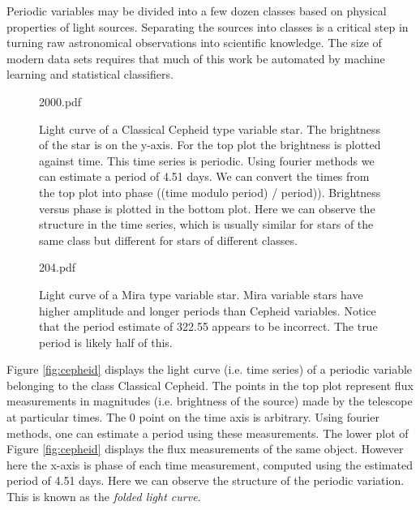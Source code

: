 \documentclass[10pt]{article}
\theoremstyle{definition}
\begin{document}
Periodic variables may be divided into a few dozen classes based on physical properties of light sources. Separating the sources into classes is a critical step in turning raw astronomical observations into scientific knowledge. The size of modern data sets requires that much of this work be automated by machine learning and statistical classifiers. 
\begin{figure}[ht]
\begin{minipage}[t]{.45\linewidth}
  \centering
    \begin{includegraphics}[scale=.48]{2000.pdf}
      \caption{Light curve of a Classical Cepheid type variable star. The brightness of the star is on the y-axis. For the top plot the brightness is plotted against time. This time series is periodic. Using fourier methods we can estimate a period of 4.51 days. We can convert the times from the top plot into phase ((time modulo period) / period)). Brightness versus phase is plotted in the bottom plot. Here we can observe the structure in the time series, which is usually similar for stars of the same class but different for stars of different classes.\label{fig:cepheid}}
    \end{includegraphics}
\end{minipage}
\hspace{1cm}
\begin{minipage}[t]{.45\linewidth}
  \centering
    \begin{includegraphics}[scale=.48]{204.pdf}
      \caption{Light curve of a Mira type variable star. Mira variable stars have higher amplitude and longer periods than Cepheid variables. Notice that the period estimate of 322.55 appears to be incorrect. The true period is likely half of this.\label{fig:mira}}
    \end{includegraphics}
\end{minipage}
\end{figure}

Figure \ref{fig:cepheid} displays the light curve (i.e. time series) of a periodic variable belonging to the class Classical Cepheid. The points in the top plot represent flux measurements in magnitudes (i.e. brightness of the source) made by the telescope at particular times. The 0 point on the time axis is arbitrary. Using fourier methods, one can estimate a period using these measurements.  The lower plot of Figure \ref{fig:cepheid} displays the flux measurements of the same object. However here the x-axis is phase of each time measurement, computed using the estimated period of 4.51 days. Here we can observe the structure of the periodic variation. This is known as the \textit{folded light curve}.
\end{document}
